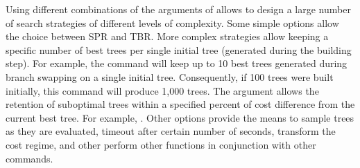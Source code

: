 Using different combinations of the arguments of  allows to design a  large number of search strategies of different levels of complexity. Some simple options allow the choice between SPR and TBR. More complex strategies allow keeping a specific number of best trees per single initial tree (generated during the building step). For example, the command  will keep up to 10 best trees generated during branch swapping on a single initial tree. Consequently, if 100 trees were built initially, this command will produce 1,000 trees. The argument  allows the retention of suboptimal trees within a specified percent of cost difference from the current best tree. For example, . Other options provide the means to sample trees as they are evaluated, timeout after certain number of seconds, transform the cost regime, and other perform other functions in conjunction with other \poy commands.







